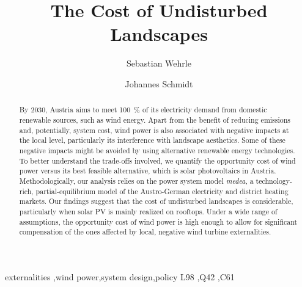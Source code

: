 \documentclass[review, 3p, times, 12pt, authoryear]{elsarticle}
\begin{document}
    \begin{frontmatter}
        \title{The Cost of Undisturbed Landscapes}
        \author[1]{Sebastian Wehrle}
        \author[1]{Johannes Schmidt}
        \address[1]{Institute for Sustainable Economic Development, University of Natural Resources and Life Sciences,
        Feistmantelstrasse 4, 1180 Vienna, Austria}

        \begin{abstract}
            By 2030, Austria aims to meet \SI{100}{\percent} of its electricity demand from domestic renewable sources, such as wind energy.
            Apart from the benefit of reducing  emissions and, potentially, system cost, wind power is also associated with negative impacts at the local level, particularly its interference with landscape aesthetics.
            Some of these negative impacts might be avoided by using alternative renewable energy technologies.
            To better understand the trade-offs involved, we quantify the opportunity cost of wind power versus its best feasible alternative, which is solar photovoltaics in Austria. Methodologically, our analysis relies on the power system model \emph{medea}, a technology-rich, partial-equilibrium model of the Austro-German electricity and district heating markets.
            Our findings suggest that the cost of undisturbed landscapes is considerable, particularly when solar PV is mainly realized on rooftops.
            Under a wide range of assumptions, the opportunity cost of wind power is high enough to allow for significant compensation of the ones affected by local, negative wind turbine externalities.
        \end{abstract}

        \begin{keyword}
            externalities \sep wind power\sep system design\sep policy
            \JEL L98 \sep Q42 \sep C61
        \end{keyword}
    \end{frontmatter}
    \newpage
\end{document}
